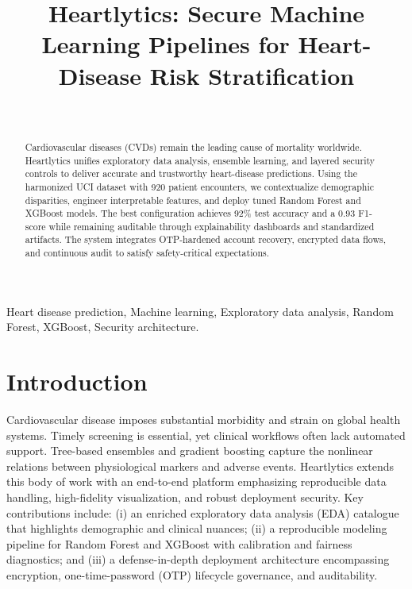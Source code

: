 \documentclass[conference]{IEEEtran}
\begin{document}
\title{Heartlytics: Secure Machine Learning Pipelines for Heart-Disease Risk Stratification}

\author{\\
}

\maketitle

\begin{abstract}
Cardiovascular diseases (CVDs) remain the leading cause of mortality worldwide. Heartlytics unifies exploratory data analysis, ensemble learning, and layered security controls to deliver accurate and trustworthy heart-disease predictions. Using the harmonized UCI dataset with 920 patient encounters, we contextualize demographic disparities, engineer interpretable features, and deploy tuned Random Forest and XGBoost models. The best configuration achieves 92\% test accuracy and a 0.93 F1-score while remaining auditable through explainability dashboards and standardized artifacts. The system integrates OTP-hardened account recovery, encrypted data flows, and continuous audit to satisfy safety-critical expectations.
\end{abstract}

\begin{IEEEkeywords}
Heart disease prediction, Machine learning, Exploratory data analysis, Random Forest, XGBoost, Security architecture.
\end{IEEEkeywords}

\section{Introduction}
Cardiovascular disease imposes substantial morbidity and strain on global health systems. Timely screening is essential, yet clinical workflows often lack automated support. Tree-based ensembles and gradient boosting capture the nonlinear relations between physiological markers and adverse events. Heartlytics extends this body of work with an end-to-end platform emphasizing reproducible data handling, high-fidelity visualization, and robust deployment security. Key contributions include: (i) an enriched exploratory data analysis (EDA) catalogue that highlights demographic and clinical nuances; (ii) a reproducible modeling pipeline for Random Forest and XGBoost with calibration and fairness diagnostics; and (iii) a defense-in-depth deployment architecture encompassing encryption, one-time-password (OTP) lifecycle governance, and auditability.
\end{document}
